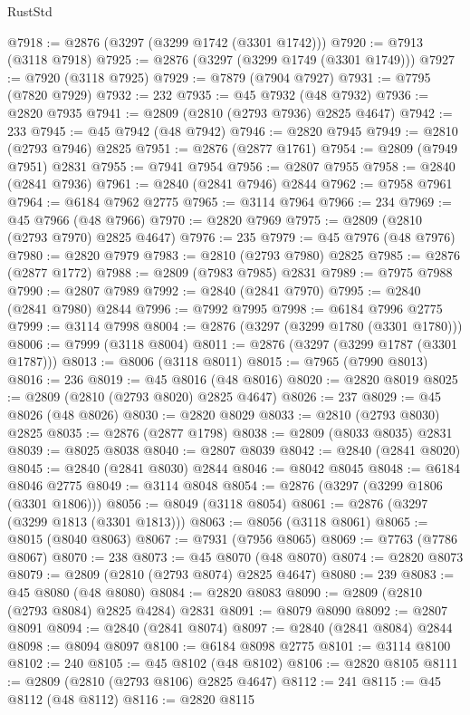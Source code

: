 \begin{lexlean}{RustStd}
\begin{coremodule}
{\begin{coremodule}
{{{{{{{{{{{{{{{{{{{{{{{{{{{{{{{{{@7918 := @2876 (@3297 (@3299 @1742 (@3301 @1742)))
@7920 := @7913 (@3118 @7918)
@7925 := @2876 (@3297 (@3299 @1749 (@3301 @1749)))
@7927 := @7920 (@3118 @7925)
@7929 := @7879 (@7904 @7927)
@7931 := @7795 (@7820 @7929)
@7932 := 232
@7935 := @45 @7932 (@48 @7932)
@7936 := @2820 @7935
@7941 := @2809 (@2810 (@2793 @7936) @2825 @4647)
@7942 := 233
@7945 := @45 @7942 (@48 @7942)
@7946 := @2820 @7945
@7949 := @2810 (@2793 @7946) @2825
@7951 := @2876 (@2877 @1761)
@7954 := @2809 (@7949 @7951) @2831
@7955 := @7941 @7954
@7956 := @2807 @7955
@7958 := @2840 (@2841 @7936)
@7961 := @2840 (@2841 @7946) @2844
@7962 := @7958 @7961
@7964 := @6184 @7962 @2775
@7965 := @3114 @7964
@7966 := 234
@7969 := @45 @7966 (@48 @7966)
@7970 := @2820 @7969
@7975 := @2809 (@2810 (@2793 @7970) @2825 @4647)
@7976 := 235
@7979 := @45 @7976 (@48 @7976)
@7980 := @2820 @7979
@7983 := @2810 (@2793 @7980) @2825
@7985 := @2876 (@2877 @1772)
@7988 := @2809 (@7983 @7985) @2831
@7989 := @7975 @7988
@7990 := @2807 @7989
@7992 := @2840 (@2841 @7970)
@7995 := @2840 (@2841 @7980) @2844
@7996 := @7992 @7995
@7998 := @6184 @7996 @2775
@7999 := @3114 @7998
@8004 := @2876 (@3297 (@3299 @1780 (@3301 @1780)))
@8006 := @7999 (@3118 @8004)
@8011 := @2876 (@3297 (@3299 @1787 (@3301 @1787)))
@8013 := @8006 (@3118 @8011)
@8015 := @7965 (@7990 @8013)
@8016 := 236
@8019 := @45 @8016 (@48 @8016)
@8020 := @2820 @8019
@8025 := @2809 (@2810 (@2793 @8020) @2825 @4647)
@8026 := 237
@8029 := @45 @8026 (@48 @8026)
@8030 := @2820 @8029
@8033 := @2810 (@2793 @8030) @2825
@8035 := @2876 (@2877 @1798)
@8038 := @2809 (@8033 @8035) @2831
@8039 := @8025 @8038
@8040 := @2807 @8039
@8042 := @2840 (@2841 @8020)
@8045 := @2840 (@2841 @8030) @2844
@8046 := @8042 @8045
@8048 := @6184 @8046 @2775
@8049 := @3114 @8048
@8054 := @2876 (@3297 (@3299 @1806 (@3301 @1806)))
@8056 := @8049 (@3118 @8054)
@8061 := @2876 (@3297 (@3299 @1813 (@3301 @1813)))
@8063 := @8056 (@3118 @8061)
@8065 := @8015 (@8040 @8063)
@8067 := @7931 (@7956 @8065)
@8069 := @7763 (@7786 @8067)
@8070 := 238
@8073 := @45 @8070 (@48 @8070)
@8074 := @2820 @8073
@8079 := @2809 (@2810 (@2793 @8074) @2825 @4647)
@8080 := 239
@8083 := @45 @8080 (@48 @8080)
@8084 := @2820 @8083
@8090 := @2809 (@2810 (@2793 @8084) @2825 @4284) @2831
@8091 := @8079 @8090
@8092 := @2807 @8091
@8094 := @2840 (@2841 @8074)
@8097 := @2840 (@2841 @8084) @2844
@8098 := @8094 @8097
@8100 := @6184 @8098 @2775
@8101 := @3114 @8100
@8102 := 240
@8105 := @45 @8102 (@48 @8102)
@8106 := @2820 @8105
@8111 := @2809 (@2810 (@2793 @8106) @2825 @4647)
@8112 := 241
@8115 := @45 @8112 (@48 @8112)
@8116 := @2820 @8115
}}}}}}}}}}}}}}}}}}}}}}}}}}}}}}}}}
\end{coremodule}}
\end{coremodule}
\end{lexlean}
